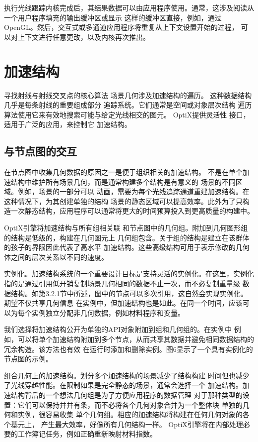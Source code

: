 执行光线跟踪内核完成后，其结果数据可以由应用程序使用。通常，这涉及阅读从一个用户程序填充的输出缓冲区或显示
这样的缓冲区直接，例如，通过OpenGL。然后，交互式或多通道应用程序将重复从上下文设置开始的过程，
可以对上下文进行任意更改，以及内核再次推出。

\section{加速结构}

寻找射线与射线交叉点的核心算法
场景几何涉及加速结构的遍历。
这种数据结构几乎是每条射线的重要组成部分
追踪系统。它们通常是空间或对象层次结构
遍历算法使用它来有效地搜索可能与给定光线相交的图元。 OptiX提供灵活性
接口，适用于广泛的应用，来控制它
加速结构。

\subsection{与节点图的交互}

在节点图中收集几何数据的原因之一是便于组织相关的加速结构。
不是在单个加速结构中维护所有场景几何，而是通常构建多个结构是有意义的
场景的不同区域。例如，场景的一部分可以
动画，需要为每个光线追踪通道重建加速结构。在这种情况下，为其创建单独的结构
场景的静态区域可以提高效率。此外为了只构造一次静态结构，应用程序可以通常将更大的时间预算投入到更高质量的构建中。

OptiX引擎将加速结构与所有组相关联
和节点图中的几何组。附加到几何图形组的结构是低级的，构建在几何图元上
几何组包含。关于组的结构是建立在该群体的孩子的界限因此代表了高水平
加速结构。这些高级结构可用于表示修改的几何体之间的层次关系以不同的速度。

实例化。加速结构系统的一个重要设计目标是支持灵活的实例化。在这里，实例化
指的是通过引用低开销复制场景几何相同的数据不止一次，而不必复制重量级
数据结构。如第3.2.1节中所述，图中的节点可以多次引用，这自然会实现实例化。期望不仅共享几何信息
在实例中，但加速结构也是如此。在同一个时间，应该可以为每个实例独立分配非几何数据，例如材料程序和变量。

我们选择将加速结构公开为单独的API对象附加到组和几何组的。在实例中
例如，可以将单个加速结构附加到多个节点，从而共享其数据并避免相同数据结构的冗余构造。该方法也有效
在运行时添加和删除实例。图6显示了一个具有实例化的节点图的示例。

组合几何上的加速结构。划分多个加速结构的场景减少了结构构建
时间但也减少了光线穿越性能。在限制如果是完全静态的场景，通常会选择一个
加速结构。加速结构背后的一个想法几何组是为了方便应用程序的数据管理
对于那种类型的设置：它们可以保持井井有条，而不必将各个几何对象合并为一个整体块
单独的几何和实例，很容易收集
单个几何组。相应的加速结构将构建在任何几何对象的各个基元上，
产生最大效率，好像所有几何结构一样。 OptiX引擎将在内部处理必要的工作簿记任务，例如正确重新映射材料指数。

